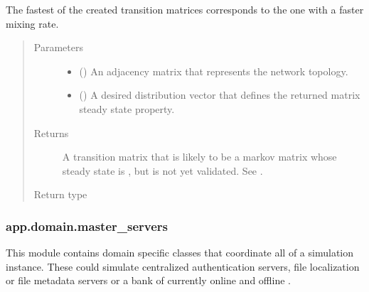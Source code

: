 \documentclass[letterpaper,10pt,english]{sphinxmanual}
\begin{document}
\begin{fulllineitems}
\begin{fulllineitems}
The fastest of the created transition matrices corresponds to the one
with a faster mixing rate.
\begin{quote}\begin{description}
\item[{Parameters}] \leavevmode\begin{itemize}
\item {} 
 () \textendash{} An adjacency matrix that represents the network topology.

\item {} 
 () \textendash{} A desired distribution vector that defines the returned
matrix steady state property.

\end{itemize}

\item[{Returns}] \leavevmode
A transition matrix that is likely to be a markov matrix whose
steady state is , but is not yet validated. See
.

\item[{Return type}] \leavevmode
{}

\end{description}\end{quote}

\end{fulllineitems}


\end{fulllineitems}



\subsubsection{app.domain.master\_servers}
\label{\detokenize{app.domain:module-app.domain.master_servers}}\label{\detokenize{app.domain:app-domain-master-servers}}
This module contains domain specific classes that coordinate all
{\hyperref[\detokenize{app.domain:module-app.domain.cluster_groups}]{}} of a simulation instance. These could
simulate centralized authentication servers, file localization or
file metadata servers or a bank of currently online and offline
{\hyperref[\detokenize{app.domain:module-app.domain.network_nodes}]{}}.
\end{document}
